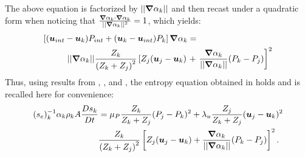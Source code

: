 The above equation is factorized by $|| \boldsymbol{\nabla} \alpha_k ||$ and then recast under a quadratic form when noticing that $\frac{\boldsymbol{\nabla} \alpha_k \cdot \boldsymbol{\nabla} \alpha_k}{|| \boldsymbol{\nabla} \alpha_k ||^2} = 1$, which yields:
\begin{align}
\label{eq:ent6}
\left[ (\boldsymbol u_{int}-\boldsymbol u_k)P_{int} + (\boldsymbol u_k-\boldsymbol u_{int})P_k \right] \boldsymbol{\nabla} \alpha_k &=  \nonumber \\
|| \boldsymbol{\nabla} \alpha_k || \frac{Z_k }{\left( Z_k+Z_j \right)^2} \left[ Z_j (\boldsymbol u_j-\boldsymbol u_k)\right.&+\left.\frac{\boldsymbol{\nabla} \alpha_k}{|| \boldsymbol{\nabla} \alpha_k ||}(P_k-P_j)\right]^2
\end{align}
Thus, using results from , ,  and , the entropy equation obtained in \cite{SEM} holds and is recalled here for convenience:
\begin{align}
(s_{e})_k^{-1} \alpha_k \rho_k A \frac{Ds_k}{Dt} &= \mu_P \frac{Z_k}{Z_k+Z_j} (P_j - P_k)^2 + \lambda_u \frac{Z_j}{Z_k+Z_j} (\boldsymbol u_j -\boldsymbol u_k)^2 \nonumber
\\
& \frac{Z_k}{\left( Z_k+Z_j \right)^2} \left[ Z_j (\boldsymbol u_j-\boldsymbol u_k)+\frac{\boldsymbol{\nabla} \alpha_k}{|| \boldsymbol{\nabla} \alpha_k ||}(P_k-P_j)\right]^2. \nonumber
\end{align}
\pagebreak{}